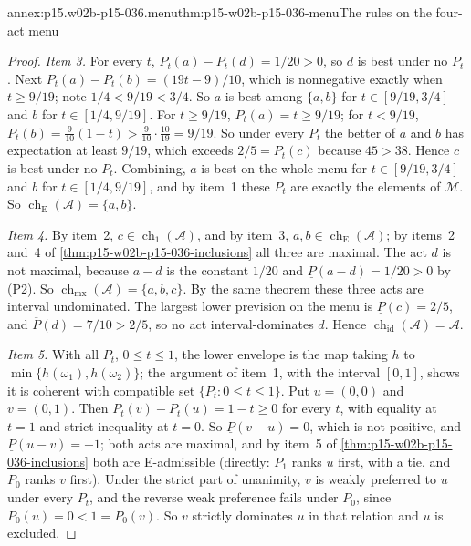 \begin{annexitem}{annex:p15.w02b-p15-036.menu}{thm:p15-w02b-p15-036-menu}{The rules on the four-act menu}
\begin{proof}
\emph{Item 3.} For every \(t\), \(P_t(a)-P_t(d)=1/20>0\), so \(d\) is best
under no \(P_t\). Next \(P_t(a)-P_t(b)=(19t-9)/10\), which is nonnegative
exactly when \(t\geq9/19\); note \(1/4<9/19<3/4\). So \(a\) is best among
\(\{a,b\}\) for \(t\in[9/19,3/4]\) and \(b\) for \(t\in[1/4,9/19]\). For
\(t\geq9/19\), \(P_t(a)=t\geq9/19\); for \(t<9/19\),
\(P_t(b)=\tfrac9{10}(1-t)>\tfrac9{10}\cdot\tfrac{10}{19}=9/19\). So under
every \(P_t\) the better of \(a\) and \(b\) has expectation at least
\(9/19\), which exceeds \(2/5=P_t(c)\) because \(45>38\). Hence \(c\) is
best under no \(P_t\). Combining, \(a\) is best on the whole menu for
\(t\in[9/19,3/4]\) and \(b\) for \(t\in[1/4,9/19]\), and by item~1 these
\(P_t\) are exactly the elements of \(\mathcal M\). So
\(\operatorname{ch}_{\mathrm E}(\mathcal A)=\{a,b\}\).

\emph{Item 4.} By item~2, \(c\in\operatorname{ch}_1(\mathcal A)\), and by
item~3, \(a,b\in\operatorname{ch}_{\mathrm E}(\mathcal A)\); by items~2
and~4 of \cref{thm:p15-w02b-p15-036-inclusions} all three are maximal.
The act \(d\) is not maximal, because \(a-d\) is the constant \(1/20\) and
\(\underline P(a-d)=1/20>0\) by (P2). So
\(\operatorname{ch}_{\mathrm{mx}}(\mathcal A)=\{a,b,c\}\). By the same
theorem these three acts are interval undominated. The largest lower
prevision on the menu is \(\underline P(c)=2/5\), and
\(\overline P(d)=7/10>2/5\), so no act interval-dominates \(d\). Hence
\(\operatorname{ch}_{\mathrm{id}}(\mathcal A)=\mathcal A\).

\emph{Item 5.} With all \(P_t\), \(0\leq t\leq1\), the lower envelope is
the map taking \(h\) to \(\min\{h(\omega_1),h(\omega_2)\}\); the argument of item~1, with
the interval \([0,1]\), shows it is coherent with compatible set
\(\{P_t:0\leq t\leq1\}\). Put \(u=(0,0)\) and \(v=(0,1)\). Then
\(P_t(v)-P_t(u)=1-t\geq0\) for every \(t\), with equality at \(t=1\) and
strict inequality at \(t=0\). So \(\underline P(v-u)=0\), which is not
positive, and \(\underline P(u-v)=-1\); both acts are maximal, and by
item~5 of \cref{thm:p15-w02b-p15-036-inclusions} both are E-admissible
(directly: \(P_1\) ranks \(u\) first, with a tie, and \(P_0\) ranks \(v\)
first). Under the strict part of unanimity, \(v\) is weakly preferred to
\(u\) under every \(P_t\), and the reverse weak preference fails under
\(P_0\), since \(P_0(u)=0<1=P_0(v)\). So \(v\) strictly dominates \(u\) in
that relation and \(u\) is excluded.
\end{proof}
\end{annexitem}

